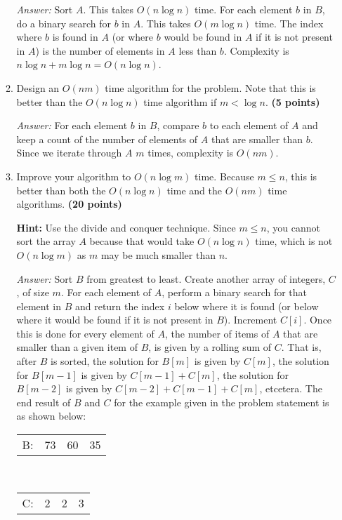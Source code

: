 \documentclass[11pt]{article}
\begin{document}
\begin{enumerate}
\begin{enumerate}
\textit{Answer:} Sort $A$. This takes $O(n\log n)$ time. For each element $b$ in $B$, do a binary search for $b$ in $A$. This takes $O(m\log n)$ time. The index where $b$ is found in $A$ (or where $b$ would be found in $A$ if it is not present in $A$) is the number of elements in $A$ less than $b$. Complexity is $n\log n + m\log n = O(n\log n)$.

\item
Design an $O(nm)$ time algorithm for the problem. Note that this is better than the $O(n\log n)$ time algorithm if $m<\log n$. {\hfill \bf (5 points)}

\textit{Answer:} For each element $b$ in $B$, compare $b$ to each element of $A$ and keep a count of the number of elements of $A$ that are smaller than $b$. Since we iterate through $A$ $m$ times, complexity is $O(nm)$.

\item
Improve your algorithm to $O(n\log m)$ time. Because $m\leq n$, this is better than both the $O(n\log n)$ time and the $O(nm)$ time algorithms. {\hfill \bf (20 points)}


{\bf Hint:} Use the divide and conquer technique. Since $m\leq n$, you cannot sort the array $A$ because that would take $O(n\log n)$ time, which is not $O(n\log m)$ as $m$ may be much smaller than $n$.

\textit{Answer:} Sort $B$ from greatest to least. Create another array of integers, $C$, of size $m$. 
For each element of $A$, perform a binary search for that element in $B$ and return the index $i$ below where it is found 
(or below where it would be found if it is not present in $B$). Increment $C[i]$. Once this is done for every element of $A$,
the number of items of $A$ that are smaller than a given item of $B$, is given by a rolling sum of $C$. That is, after $B$ is sorted,
the solution for $B[m]$ is given by $C[m]$, the solution for $B[m-1]$ is given by $C[m-1] + C[m]$, the solution for $B[m-2]$ is given
by $C[m-2]+C[m-1]+C[m]$, etcetera. The end result of $B$ and $C$ for the example given in the problem statement is as shown below:

\begin{center}
\begin{tabular}{c|c|c|c|}
\cline{2-4}
B: & 73 & 60 & 35 \\
\cline{2-4}
\end{tabular} \\ \vspace{2mm}
\begin{tabular}{c|c|c|c|}
\cline{2-4}
C: & 2 & 2 & 3 \\
\cline{2-4}
\end{tabular}
\end{center}


\end{enumerate}
\end{enumerate}
\end{document}
